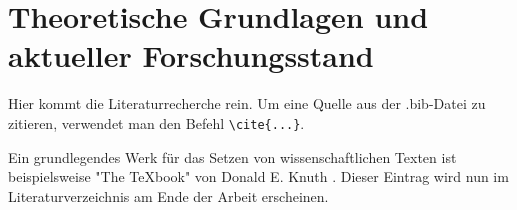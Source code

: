
\section{Theoretische Grundlagen und aktueller Forschungsstand}
\label{chap:theorie}

Hier kommt die Literaturrecherche rein. Um eine Quelle aus der
.bib-Datei zu zitieren, verwendet man den Befehl \verb|\cite{...}|.

Ein grundlegendes Werk für das Setzen von wissenschaftlichen Texten ist
beispielsweise "The TeXbook" von Donald E. Knuth \cite{knuth1984texbook}.
Dieser Eintrag wird nun im Literaturverzeichnis am Ende der Arbeit erscheinen.